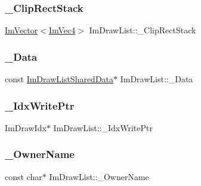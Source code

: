 \hypertarget{struct_im_draw_list_ae950024f053f3c94dc2c763d20be609d}{}\label{struct_im_draw_list_ae950024f053f3c94dc2c763d20be609d} 
\subsubsection{\texorpdfstring{\+\_\+\+Clip\+Rect\+Stack}{\_ClipRectStack}}
{\footnotesize\ttfamily \hyperlink{class_im_vector}{Im\+Vector}$<$\hyperlink{struct_im_vec4}{Im\+Vec4}$>$ Im\+Draw\+List\+::\+\_\+\+Clip\+Rect\+Stack}

\hypertarget{struct_im_draw_list_a606bbd354211fe6f84cc11ebe53e7903}{}\label{struct_im_draw_list_a606bbd354211fe6f84cc11ebe53e7903} 
\subsubsection{\texorpdfstring{\+\_\+\+Data}{\_Data}}
{\footnotesize\ttfamily const \hyperlink{struct_im_draw_list_shared_data}{Im\+Draw\+List\+Shared\+Data}$\ast$ Im\+Draw\+List\+::\+\_\+\+Data}

\hypertarget{struct_im_draw_list_a771f4c7f71873852fe030c3e498e5843}{}\label{struct_im_draw_list_a771f4c7f71873852fe030c3e498e5843} 
\subsubsection{\texorpdfstring{\+\_\+\+Idx\+Write\+Ptr}{\_IdxWritePtr}}
{\footnotesize\ttfamily Im\+Draw\+Idx$\ast$ Im\+Draw\+List\+::\+\_\+\+Idx\+Write\+Ptr}

\hypertarget{struct_im_draw_list_a643f385fb9d5fc35a431e72a10a212f5}{}\label{struct_im_draw_list_a643f385fb9d5fc35a431e72a10a212f5} 
\subsubsection{\texorpdfstring{\+\_\+\+Owner\+Name}{\_OwnerName}}
{\footnotesize\ttfamily const char$\ast$ Im\+Draw\+List\+::\+\_\+\+Owner\+Name}

